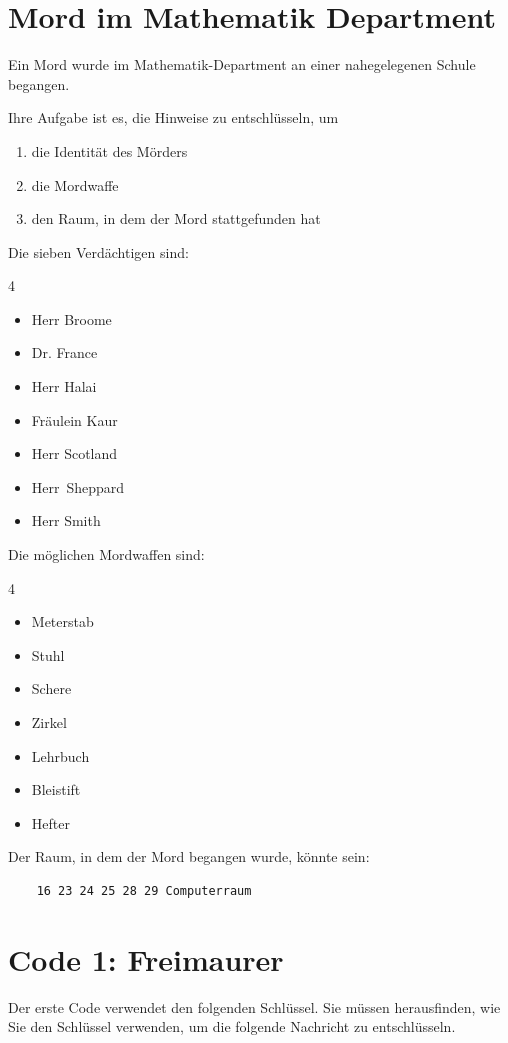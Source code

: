 \documentclass[11pt,a4paper]{report}
\begin{document}
\section*{Mord im Mathematik Department}
Ein Mord wurde im Mathematik-Department an einer
nahegelegenen Schule begangen.

Ihre Aufgabe ist es, die Hinweise zu entschlüsseln, um
\begin{enumerate}
    \item die Identität des Mörders
    \item die Mordwaffe
   \item den Raum, in dem der Mord stattgefunden hat

\end{enumerate}

Die sieben Verdächtigen sind:
\begin{multicols}{4}
    \begin{itemize}
        \item Herr Broome 
        \item Dr. France 
        \item Herr Halai 
        \item Fräulein Kaur
        \item Herr Scotland 
        \item Herr~Sheppard 
        \item Herr Smith
    \end{itemize}
\end{multicols}
Die möglichen Mordwaffen sind:
\begin{multicols}{4}
    \begin{itemize}
        \item Meterstab 
        \item Stuhl 
        \item Schere
        \item Zirkel 
        \item Lehrbuch 
        \item Bleistift
        \item Hefter
    \end{itemize}
\end{multicols}
Der Raum, in dem der Mord begangen wurde, könnte sein:
\begin{verbatim}
    16 23 24 25 28 29 Computerraum
\end{verbatim}

\newpage

\section*{Code 1: Freimaurer}
Der erste Code verwendet den folgenden Schlüssel. Sie müssen herausfinden, wie Sie den Schlüssel
verwenden, um die folgende Nachricht zu entschlüsseln.
\end{document}
